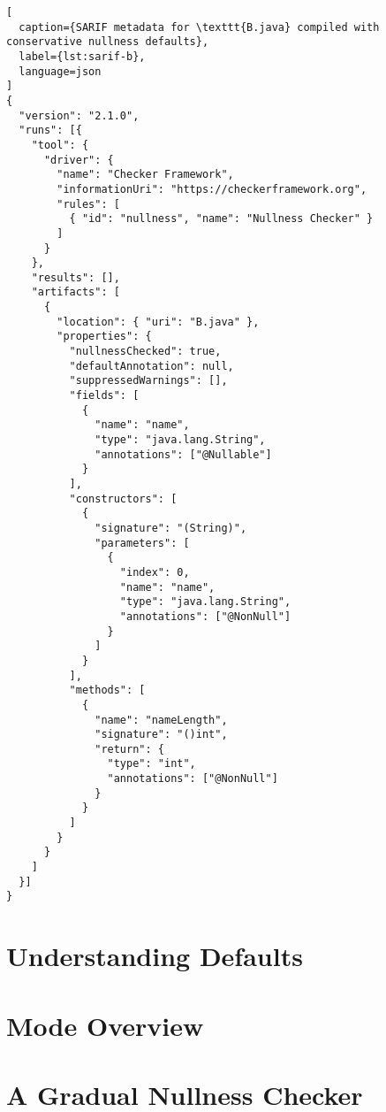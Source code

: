 \documentclass[12pt]{article}
\begin{document}
\begin{lstlisting}[
  caption={SARIF metadata for \texttt{B.java} compiled with conservative nullness defaults},
  label={lst:sarif-b},
  language=json
]
{
  "version": "2.1.0",
  "runs": [{
    "tool": {
      "driver": {
        "name": "Checker Framework",
        "informationUri": "https://checkerframework.org",
        "rules": [
          { "id": "nullness", "name": "Nullness Checker" }
        ]
      }
    },
    "results": [],
    "artifacts": [
      {
        "location": { "uri": "B.java" },
        "properties": {
          "nullnessChecked": true,
          "defaultAnnotation": null,
          "suppressedWarnings": [],
          "fields": [
            {
              "name": "name",
              "type": "java.lang.String",
              "annotations": ["@Nullable"]
            }
          ],
          "constructors": [
            {
              "signature": "(String)",
              "parameters": [
                {
                  "index": 0,
                  "name": "name",
                  "type": "java.lang.String",
                  "annotations": ["@NonNull"]
                }
              ]
            }
          ],
          "methods": [
            {
              "name": "nameLength",
              "signature": "()int",
              "return": {
                "type": "int",
                "annotations": ["@NonNull"]
              }
            }
          ]
        }
      }
    ]
  }]
}
\end{lstlisting}

\section{Understanding Defaults}\label{sec:defaults}

\section{Mode Overview}\label{sec:modes}

\section{A Gradual Nullness Checker}\label{sec:nullness}



\end{document}
